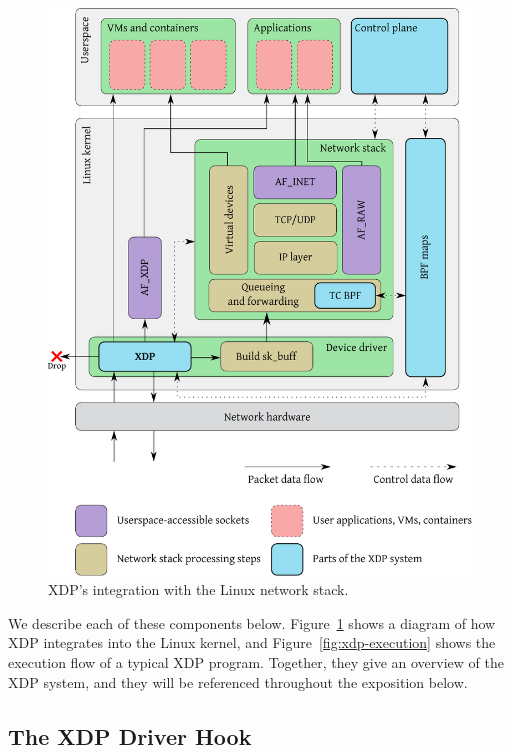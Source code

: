 \documentclass[10pt,sigconf]{acmart}
\begin{document}
\begin{figure}[t]
\centering
\includegraphics[width=\linewidth]{figures/kernel-diagram.pdf}
\caption{\label{fig:xdp-kernel} XDP's integration with the Linux network stack.}
\end{figure}


We describe each of these components below. Figure~\ref{fig:xdp-kernel} shows a
diagram of how XDP integrates into the Linux kernel, and
Figure~\ref{fig:xdp-execution} shows the execution flow of a typical XDP
program. Together, they give an overview of the XDP system, and they will be
referenced throughout the exposition below.

\subsection{The XDP Driver Hook}
\label{sec:prog-model}
\end{document}
